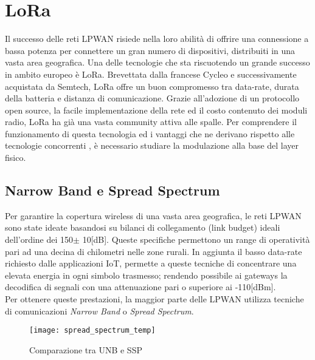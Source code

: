 \chapter{LoRa}
Il successo delle reti LPWAN risiede nella loro abilità di offrire una
connessione a bassa potenza per connettere un gran numero di dispositivi, 
distribuiti in una vasta area geografica. 
Una delle  tecnologie che sta riscuotendo un grande successo in 
ambito europeo è LoRa.
Brevettata dalla francese Cycleo e successivamente acquistata da Semtech, LoRa 
 offre un buon compromesso tra data-rate,
durata della batteria e distanza di comunicazione.
Grazie all'adozione di un protocollo open source, la facile implementazione della rete
ed il costo contenuto dei moduli radio, LoRa ha già una vasta community attiva alle
spalle. Per comprendere il funzionamento di questa tecnologia ed i vantaggi che ne
derivano rispetto alle tecnologie concorrenti , è necessario
studiare la modulazione alla base del layer fisico.

\section{Narrow Band e Spread Spectrum}
Per garantire la copertura wireless di una vasta area geografica, le reti LPWAN 
sono state ideate basandosi su  bilanci di
collegamento (link budget) ideali  dell'ordine dei 150$\pm$ 10[dB]. 
Queste specifiche permettono  un range di operatività
pari ad una decina di chilometri nelle zone rurali. 
In aggiunta il basso data-rate richiesto dalle applicazioni IoT, permette a
queste tecniche di concentrare una elevata energia in
ogni simbolo trasmesso; rendendo possibile ai gateways la decodifica di 
segnali con una attenuazione pari o superiore ai -110[dBm].\\
Per ottenere queste
prestazioni, la maggior parte delle LPWAN  utilizza tecniche di comunicazioni
\emph{Narrow Band} o \emph{Spread Spectrum}.

\begin{figure}[ht]
\centering 
\texttt{[image: spread\_spectrum\_temp]}
\caption{Comparazione tra UNB e SSP}
\end{figure}

